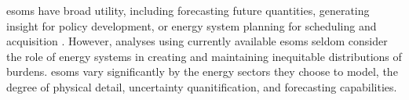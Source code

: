 
\Acp{esom} have broad utility, including forecasting future quantities,
generating insight for policy development, or energy system planning for
scheduling and acquisition \cite{decarolis_using_2011, yue_review_2018}.
However, analyses using currently available \acp{esom} seldom consider the role
of energy systems in creating and maintaining inequitable distributions of
burdens. \acp{esom} vary significantly by the energy sectors they
choose to model, the degree of physical detail, uncertainty quanitification, 
and forecasting capabilities. 


